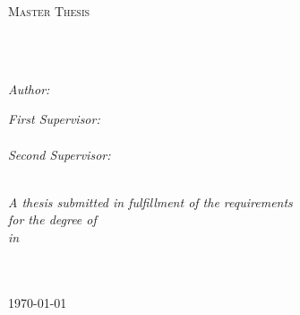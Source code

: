\documentclass[
12pt, %
oneside, %
english, %
doublespacing, %
parskip, %
headsepline, %
chapterinoneline, %
]{MastersDoctoralThesis} %
\author{Xhoni \textsc{Robo}} %
\begin{document}
\frontmatter %

\pagestyle{plain} %


\begin{titlepage}
\begin{center}

{\scshape\LARGE \univname\par}\vspace{1.5cm} %
\textsc{\Large Master Thesis}\\[0.5cm] %

\HRule \\ %
{\huge \bfseries \ttitle\par}\vspace{0.4cm} %
\HRule \\ %
 
\begin{minipage}[t]{0.4\textwidth}
\begin{flushleft} \large
\emph{Author:}\\
{\authorname} %
\end{flushleft}
\end{minipage}
\begin{minipage}[t]{0.4\textwidth}
\begin{flushright} \large
\emph{First Supervisor:} \\
{\supname} \\ %
\emph{Second Supervisor:} \\
{\examname} %
\end{flushright}
\end{minipage}\\[1.0cm]


\large \textit{A thesis submitted in fulfillment of the requirements\\ for the degree of \degreename}\\[0.3cm] %
\textit{in}\\[0.4cm]
\groupname\\\facname\\[0.5cm] %
 
\vfill

{\large \today}\\[2cm] %
 
\vfill
\end{center}
\end{titlepage}
\end{document}
